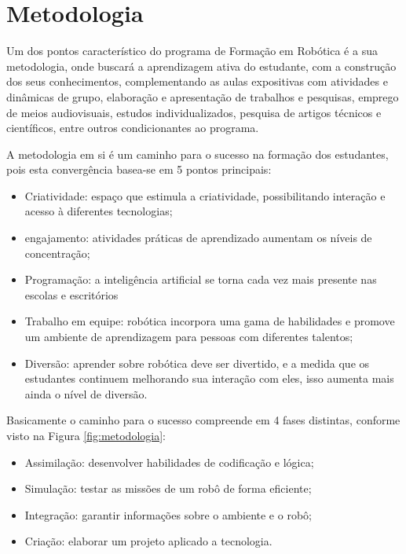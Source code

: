 \chapter{Metodologia}
\label{chap:met}

Um dos pontos característico do programa de Formação em Robótica é a sua metodologia, onde buscará a aprendizagem ativa do estudante, com a construção dos seus conhecimentos, complementando as aulas expositivas com atividades e dinâmicas de grupo, elaboração e apresentação de trabalhos e pesquisas, emprego de meios audiovisuais, estudos individualizados, pesquisa de artigos técnicos e científicos, entre outros condicionantes ao programa.

A metodologia em si é um caminho para o sucesso na formação dos estudantes, pois esta convergência basea-se em 5 pontos principais:

\begin{itemize}
  \item Criatividade: espaço que estimula a criatividade, possibilitando interação e acesso à diferentes tecnologias;
  \item engajamento: atividades práticas de aprendizado aumentam os níveis de concentração;
  \item Programação: a inteligência artificial se torna cada vez mais presente nas escolas e escritórios
  \item Trabalho em equipe: robótica incorpora uma gama de habilidades e promove um ambiente de aprendizagem para pessoas com diferentes talentos;
  \item Diversão: aprender sobre robótica deve ser divertido, e a medida que os estudantes continuem melhorando sua interação com eles, isso aumenta mais ainda o nível de diversão.
\end{itemize}

Basicamente o caminho para o sucesso compreende em 4 fases distintas, conforme visto na Figura \ref{fig:metodologia}:

\begin{itemize}
  \item Assimilação: desenvolver habilidades de codificação e lógica;
  \item Simulação: testar as missões de um robô de forma eficiente;
  \item Integração: garantir informações sobre o ambiente e o robô;
  \item Criação: elaborar um projeto aplicado a tecnologia.
\end{itemize}

